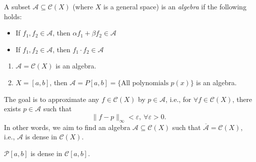 \begin{definition}[Algebra]
A subset $\mathcal{A}\subseteq\mathcal{C}(X)$ (where $X$ is a general space) is an \emph{algebra} if the following holds:
\begin{itemize}
\item
If $f_1,f_2\in\mathcal{A}$, then $\alpha f_1 + \beta f_2\in\mathcal{A}$
\item
If $f_1,f_2\in\mathcal{A}$, then $f_1\cdot f_2\in\mathcal{A}$
\end{itemize}
\end{definition}
\begin{example}
\begin{enumerate}
\item
$\mathcal{A} = \mathcal{C}(X)$ is an algebra.
\item
$X=[a,b]$, then $\mathcal{A}=P[a,b] = \{\text{All polynomials $p(x)$}\}$ is an algebra.
\end{enumerate}
\end{example}

The goal is to approximate any $f\in\mathcal{C}(X)$ by $p\in\mathcal{A}$, i.e., for $\forall f\in\mathcal{C}(X)$, there exists $p\in\mathcal{A}$ such that
\[
\|f - p\|_\infty<\varepsilon,\ \forall \varepsilon>0.
\]
In other words, we aim to find an algebra $\mathcal{A}\subseteq\mathcal{C}(X)$ such that 
$\overline{\mathcal{A}}=\mathcal{C}(X)$, i.e., $\mathcal{A}$ is dense in $\mathcal{C}(X)$.

\begin{theorem}
$\mathcal{P}[a,b]$ is dense in $\mathcal{C}[a,b]$.
\end{theorem}

